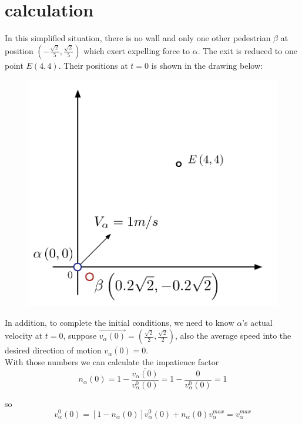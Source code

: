 \section{calculation}
In this simplified situation, there is no wall and only one other pedestrian $\beta$ at position $(-\frac{\sqrt{2}}{5}, \frac{\sqrt{2}}{5})$ which exert expelling force to $\alpha$.  The exit is reduced to one point $E(4,4)$.  Their positions at $t=0$ is shown in the drawing below:\\

\begin{figure}
\centering
{\includegraphics[scale=0.45]{calculation.pdf}} 
\caption{\small{}\label{calc}}
\end{figure}

In addition, to complete the initial conditions, we need to know $\alpha$'s actual velocity at $t=0$, suppose $\overrightarrow{v_{\alpha}(0)}=(\frac{\sqrt{2}}{2}, \frac{\sqrt{2}}{2})$, also the average speed into the desired direction of motion $\overline{v_{\alpha}(0)}=0$.\\

With those numbers we can calculate the impatience factor 
 \begin{equation}
 n_{\alpha}(0)=1-\frac{\overline{v_{\alpha}(0)}}{v^{0}_{\alpha}(0)}=1-\dfrac{0}{v^{0}_{\alpha}(0)}=1
 \end{equation}

so 
 \begin{equation}
 v^{0}_{\alpha}(0)=[1-n_{\alpha}(0)]v^{0}_{\alpha}(0) + n_{\alpha}(0)v_{\alpha}^{max} = v_{\alpha}^{max}
 \end{equation}
 
